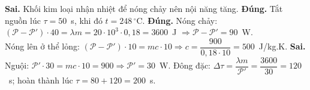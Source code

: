 \begin{ex}
{\begin{itemchoice}
				\itemch \textbf{Sai.} Khối kim loại nhận nhiệt để nóng chảy nên nội năng tăng.
				\itemch \textbf{Đúng.} Tắt nguồn lúc $\tau=50$~s, khi đó $t=248\,^\circ\text{C}$.
				\itemch \textbf{Đúng.} Nóng chảy: $(\mathcal{P}-\mathcal{P}')\cdot 40=\lambda m=20\cdot 10^3\cdot 0{,}18=3600$~J $\Rightarrow\mathcal{P}-\mathcal{P}'=90$~W.\\
				Nóng lên ở thể lỏng: $(\mathcal{P}-\mathcal{P}')\cdot 10=mc\cdot 10\Rightarrow c=\dfrac{900}{0{,}18\cdot 10}=500$~J/kg.K.
				\itemch \textbf{Sai.} Nguội: $\mathcal{P}'\cdot 30=mc\cdot 10=900\Rightarrow\mathcal{P}'=30$~W. Đông đặc: $\Delta\tau=\dfrac{\lambda m}{\mathcal{P}'}=\dfrac{3600}{30}=120$~s; hoàn thành lúc $\tau=80+120=200$~s.
			\end{itemchoice}
		}
	\end{ex}

